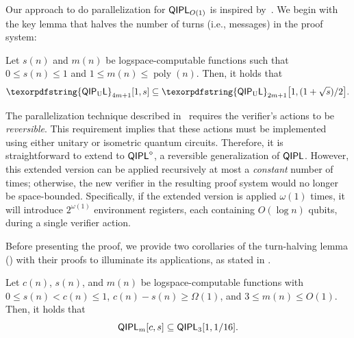 \documentclass[10pt,a4paper]{article}
\numberwithin{equation}{section}
\numberwithin{figure}{section}
\newcommand{\QIPL}{\textnormal{\textsf{QIPL}}\xspace}
\newcommand{\QIPLconst}{\texorpdfstring{\textnormal{\textsf{QIPL}\textsubscript{O(1)}}}\xspace}
\newcommand{\QIPUL}{\texorpdfstring{\textnormal{\textsf{QIP}\textsubscript{\textnormal{U}}\textsf{L}}}\xspace}
\DeclarePairedDelimiter\sbra{\lbrack}{\rbrack}
\DeclareMathOperator\poly{poly}
\begin{document}
Our approach to do parallelization for $\QIPL_{O(1)}$ is inspired by~\cite[Section 4]{KKMV09}. We begin with the key lemma that halves the number of turns (i.e., messages) in the proof system:

\begin{lemma}
    \label{lemma:QIPL-halving-parallelization}
    Let $s(n)$ and $m(n)$ be logspace-computable functions such that $0 \leq s(n) \leq 1$ and $1 \leq m(n) \leq \poly(n)$. Then, it holds that
    \[ \QIPUL_{4m+1}[1,s] \subseteq \QIPUL_{2m+1}\sbra*{1,(1+\sqrt{s})/2}. \]
\end{lemma}

\begin{remark}
    \label{remark:turn-havling-limitations}
    The parallelization technique described in~\cite[Section 4]{KKMV09} requires the verifier's actions to be \textit{reversible}. This requirement implies that these actions must be implemented using either unitary or isometric quantum circuits. Therefore, it is straightforward to extend  to $\QIPL^{\diamond}$, a reversible generalization of $\QIPL{}$. However, this extended version can be applied recursively at most a \textit{constant} number of times; otherwise, the new verifier in the resulting proof system would no longer be space-bounded. Specifically, if the extended version is applied $\omega(1)$ times, it will introduce $2^{\omega(1)}$ environment registers, each containing $O(\log n)$ qubits, during a single verifier action. 
\end{remark}

\vspace{1em}
Before presenting the proof, we provide two corollaries of the turn-halving lemma () with their proofs to illuminate its applications, as stated in . 

\begin{corollary}[$\QIPLconst \subseteq \QIPL_3$]
    \label{corr:QIPLconst-in-QIPL3}
    Let $c(n)$, $s(n)$, and $m(n)$ be logspace-computable functions with $0 \leq s(n) < c(n) \leq 1$, $c(n) - s(n) \geq \Omega(1)$, and $3 \leq m(n) \leq O(1)$. Then, it holds that 
    \[ \QIPL_m[c,s] \subseteq \QIPL_3[1,1/16]. \]
\end{corollary}
\end{document}

